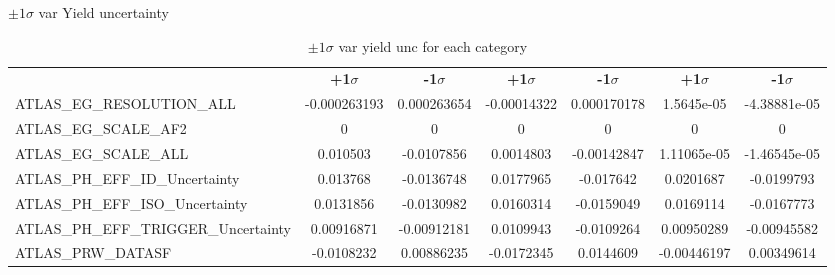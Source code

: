 \documentclass[10pt,UKenglish, leqno, xcolor = dvipsnames]{beamer}
\begin{document}
\begin{frame}{$\pm1\sigma$ var Yield uncertainty}
\begin{table}[tbp]
{\begin{tabular}{lcccccc}
						& \textbf{+1$\sigma$} & \textbf{-1$\sigma$}
						& \textbf{+1$\sigma$} & \textbf{-1$\sigma$}
						& \textbf{+1$\sigma$} & \textbf{-1$\sigma$} \\
						
						\cmidrule(lr){2-3} \cmidrule(lr){4-5} \cmidrule(lr){6-7} 
						ATLAS\_EG\_RESOLUTION\_ALL & -0.000263193 & 0.000263654 & -0.00014322 & 0.000170178 & 1.5645e-05 & -4.38881e-05 \\
						ATLAS\_EG\_SCALE\_AF2  & 0 & 0 & 0 & 0 & 0 &  0 \\
						ATLAS\_EG\_SCALE\_ALL  & 0.010503 & -0.0107856 & 0.0014803 & -0.00142847 & 1.11065e-05 & -1.46545e-05 \\
						ATLAS\_PH\_EFF\_ID\_Uncertainty & 0.013768 & -0.0136748 & 0.0177965 & -0.017642 & 0.0201687 & -0.0199793 \\
						ATLAS\_PH\_EFF\_ISO\_Uncertainty  & 0.0131856 & -0.0130982 & 0.0160314 & -0.0159049 & 0.0169114 & -0.0167773 \\
						ATLAS\_PH\_EFF\_TRIGGER\_Uncertainty & 0.00916871 & -0.00912181 & 0.0109943 & -0.0109264 & 0.00950289 & -0.00945582 \\
						ATLAS\_PRW\_DATASF & -0.0108232 & 0.00886235 & -0.0172345 & 0.0144609 & -0.00446197 & 0.00349614 \\
						\bottomrule[1.5pt]
					\end{tabular}
				}
				\caption{$\pm1\sigma$ var yield unc for each category}
			\end{table}
			\vfill
		\end{frame}
	
\end{document}
